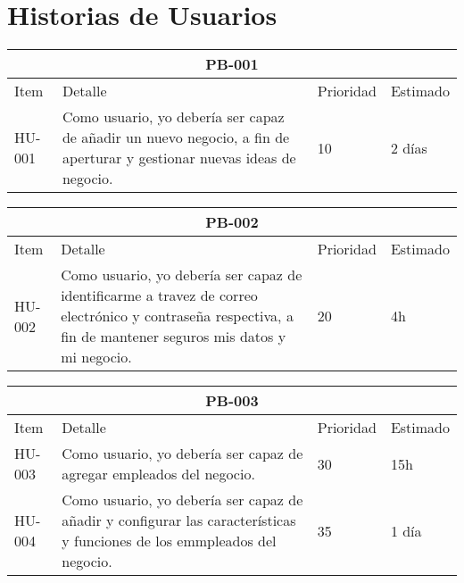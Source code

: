 \chapter{Historias de Usuarios}

\begin{table}[htbp]
	\begin{center}
		\begin{tabular}{| p{1.5cm} |p{9cm} | p{1.6cm} | p{1.6cm}|}
			\hline
			\multicolumn{4}{|c|}{PB-001}\\
			\hline
			Item & Detalle & Prioridad & Estimado \\
			\hline
			HU-001 & Como usuario, yo debería ser capaz de añadir un nuevo negocio, a fin de aperturar y gestionar nuevas ideas de negocio. & 10 & 2 días \\
			\hline	
		\end{tabular}
	\end{center}
\end{table}

\begin{table}[htbp]
	\begin{center}
		\begin{tabular}{| p{1.5cm} |p{9cm} | p{1.6cm} | p{1.6cm}|}
			\hline
			\multicolumn{4}{|c|}{PB-002}\\
			\hline
			Item & Detalle & Prioridad & Estimado \\
			\hline
			HU-002 & Como usuario, yo debería ser capaz de identificarme a travez de correo electrónico y contraseña respectiva, a fin de mantener seguros mis datos y mi negocio.  & 20 & 4h \\
			\hline	
		\end{tabular}
	\end{center}
\end{table}

\begin{table}[htbp]
	\begin{center}
		\begin{tabular}{| p{1.5cm} |p{9cm} | p{1.6cm} | p{1.6cm}|}
			\hline
			\multicolumn{4}{|c|}{PB-003}\\
			\hline
			Item & Detalle & Prioridad & Estimado \\
			\hline
			HU-003 & Como usuario, yo debería ser capaz de agregar empleados del negocio.& 30 & 15h \\
			\hline
			HU-004 & Como usuario, yo debería ser capaz de añadir y configurar las características y funciones de los emmpleados del negocio.& 35 & 1 día \\
			\hline	
		\end{tabular}
	\end{center}
\end{table}

